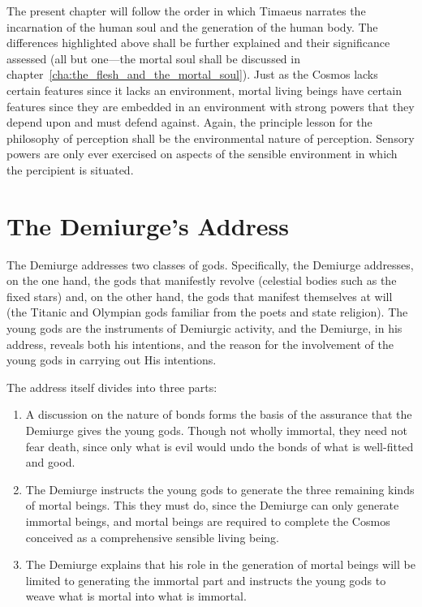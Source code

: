 The present chapter will follow the order in which Timaeus narrates the incarnation of the human soul and the generation of the human body. The differences highlighted above shall be further explained and their significance assessed (all but one---the mortal soul shall be discussed in chapter~\ref{cha:the_flesh_and_the_mortal_soul}). Just as the Cosmos lacks certain features since it lacks an environment, mortal living beings have certain features since they are embedded in an environment with strong powers that they depend upon and must defend against. Again, the principle lesson for the philosophy of perception shall be the environmental nature of perception. Sensory powers are only ever exercised on aspects of the sensible environment in which the percipient is situated.


\section{The Demiurge's Address} %
\label{sec:the_demiurge_addressing_the_gods}

The Demiurge addresses two classes of gods. Specifically, the Demiurge addresses, on the one hand, the gods that manifestly revolve (celestial bodies such as the fixed stars) and, on the other hand, the gods that manifest themselves at will (the Titanic and Olympian gods familiar from the poets and state religion). The young gods are the instruments of Demiurgic activity, and the Demiurge, in his address, reveals both his intentions, and the reason for the involvement of the young gods in carrying out His intentions.

The address itself divides into three parts:
\begin{enumerate}[(1)]
	\item A discussion on the nature of bonds forms the basis of the assurance that the Demiurge gives the young gods. Though not wholly immortal, they need not fear death, since only what is evil would undo the bonds of what is well-fitted and good.
	\item The Demiurge instructs the young gods to generate the three remaining kinds of mortal beings. This they must do, since the Demiurge can only generate immortal beings, and mortal beings are required to complete the Cosmos conceived as a comprehensive sensible living being.
	\item The Demiurge explains that his role in the generation of mortal beings will be limited to generating the immortal part and instructs the young gods to weave what is mortal into what is immortal.
\end{enumerate}


